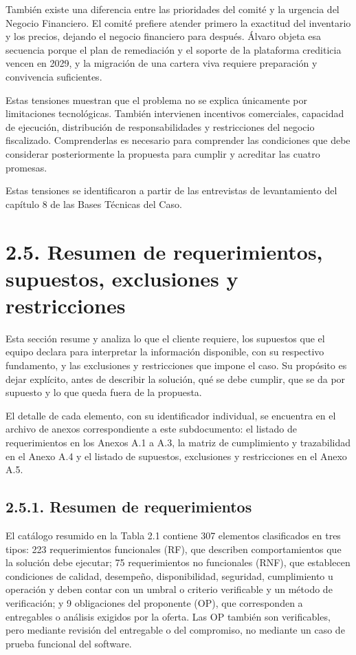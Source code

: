\documentclass[11pt]{article}
\begin{document}
También existe una diferencia entre las prioridades del comité y la urgencia del Negocio Financiero. El comité prefiere atender primero la exactitud del inventario y los precios, dejando el negocio financiero para después. Álvaro objeta esa secuencia porque el plan de remediación y el soporte de la plataforma crediticia vencen en 2029, y la migración de una cartera viva requiere preparación y convivencia suficientes.

Estas tensiones muestran que el problema no se explica únicamente por limitaciones tecnológicas. También intervienen incentivos comerciales, capacidad de ejecución, distribución de responsabilidades y restricciones del negocio fiscalizado. Comprenderlas es necesario para comprender las condiciones que debe considerar posteriormente la propuesta para cumplir y acreditar las cuatro promesas.

Estas tensiones se identificaron a partir de las entrevistas de levantamiento del capítulo 8 de las Bases Técnicas del Caso.

\section{2.5. Resumen de requerimientos, supuestos, exclusiones y restricciones}\label{resumen-de-requerimientos-supuestos-exclusiones-y-restricciones}

Esta sección resume y analiza lo que el cliente requiere, los supuestos que el equipo declara para interpretar la información disponible, con su respectivo fundamento, y las exclusiones y restricciones que impone el caso. Su propósito es dejar explícito, antes de describir la solución, qué se debe cumplir, que se da por supuesto y lo que queda fuera de la propuesta. 

El detalle de cada elemento, con su identificador individual, se encuentra en el archivo de anexos correspondiente a este subdocumento: el listado de requerimientos en los Anexos A.1 a A.3, la matriz de cumplimiento y trazabilidad en el Anexo A.4 y el listado de supuestos, exclusiones y restricciones en el Anexo A.5.

\subsection{2.5.1. Resumen de requerimientos}\label{resumen-de-requerimientos}

El catálogo resumido en la Tabla 2.1 contiene 307 elementos clasificados en tres tipos: 223 requerimientos funcionales (RF), que describen comportamientos que la solución debe ejecutar; 75 requerimientos no funcionales (RNF), que establecen condiciones de calidad, desempeño, disponibilidad, seguridad, cumplimiento u operación y deben contar con un umbral o criterio verificable y un método de verificación; y 9 obligaciones del proponente (OP), que corresponden a entregables o análisis exigidos por la oferta. Las OP también son verificables, pero mediante revisión del entregable o del compromiso, no mediante un caso de prueba funcional del software.
\end{document}
